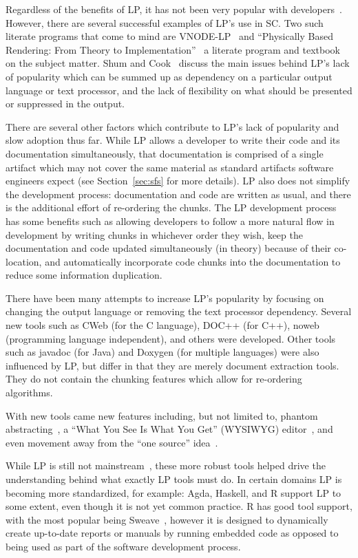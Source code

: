 Regardless of the benefits of LP, it has not been very popular with 
developers~\cite{ShumAndCook1993}. However, there are
several successful examples of LP's use in SC. Two such literate programs that 
come to mind are VNODE-LP~\cite{Nedialkov2006} and ``Physically Based 
Rendering: From Theory to Implementation''~\cite{PharrAndHumphreys2004} a 
literate program and textbook on the subject matter. Shum and 
Cook~\cite{ShumAndCook1993} discuss the main issues behind LP's lack of 
popularity which can be summed up as dependency on a 
particular output language or text processor, and the lack of flexibility on 
what should be presented or suppressed in the output.

There are several other factors which contribute to LP's lack of popularity and 
slow adoption thus far. While LP allows a developer to write their code and its 
documentation simultaneously, that documentation is comprised of a single 
artifact which may not cover the same material as standard artifacts software 
engineers expect (see Section~\ref{sec:sfs} for more details). LP also does not 
simplify the development process: documentation and code are written as usual, 
and there is the additional effort of re-ordering the chunks. The LP 
development process has some benefits such as allowing developers to follow a 
more natural flow in development by writing chunks in whichever order they 
wish, keep the documentation and code updated simultaneously (in theory) 
because of their co-location, and automatically incorporate code chunks into 
the documentation to reduce some information duplication.

There have been many attempts to increase LP's popularity by focusing on 
changing the output language or removing the text processor dependency. Several
new tools such as CWeb (for the C language), DOC++ (for C++), noweb 
(programming language independent), and others were developed. Other tools such 
as javadoc (for Java) and Doxygen (for multiple languages) were also influenced 
by LP, but differ in that they are merely document extraction tools. They do 
not contain the chunking features which allow for re-ordering algorithms.

With new tools came new features including, but not limited to, phantom
abstracting~\cite{ShumAndCook1993}, a ``What You See Is What You Get'' (WYSIWYG)
editor~\cite{FritzsonGunnarssonAndJirstrand2002}, and even movement away from 
the ``one source'' idea~\cite{Simonis2003}.

While LP is still not mainstream~\cite{Ramsey1994}, these more robust 
tools helped drive the understanding behind what exactly LP tools must 
do. In certain domains LP is becoming more standardized, for 
example: Agda, Haskell, and R support LP to some extent, even though it is not 
yet common practice. R has good tool support, with the most popular being
Sweave~\cite{Leisch2002}, however it is designed to dynamically create
up-to-date reports or manuals by running embedded code as opposed to being used
as part of the software development process. 

